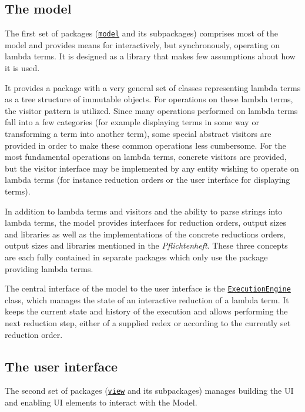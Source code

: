 \documentclass[a4paper, parskip=half]{scrartcl}
\newcommand{\pkglnk}[1]{\hyperref[pkg:edu.kit.wavelength.client.#1]{#1}}
\begin{document}
\subsection{The model}

The first set of packages (\texttt{\pkglnk{model}} and its subpackages) comprises most of the model and provides means for interactively, but
synchronously, operating on lambda terms. It is designed as a library that makes few
assumptions about how it is used.

It provides a package with a very general set of classes representing
lambda terms as a tree structure of immutable objects. For operations on these lambda
terms, the visitor pattern is utilized. Since many operations performed on lambda terms
fall into a few categories (for example displaying terms in some way or transforming a term
into another term), some special abstract visitors are provided in order to make these common
operations less cumbersome. For the most fundamental operations on lambda terms, concrete
visitors are provided, but the visitor interface may be implemented by any entity wishing
to operate on lambda terms (for instance reduction orders or the user interface for displaying
terms).

In addition to lambda terms and visitors and the ability to parse strings into
lambda terms, the model provides interfaces for reduction orders,
output sizes and libraries as well as the implementations of the concrete reductions orders,
output sizes and libraries mentioned in the \textit{Pflichtenheft}. These three
concepts are each fully contained in separate packages which only use the package
providing lambda terms.

The central interface of the model to the user interface is the
\texttt{\hyperref[type:edu.kit.wavelength.client.model.ExecutionEngine]{ExecutionEngine}}
class, which manages the state of an interactive reduction of a lambda term. It
keeps the current state and history of the execution and allows performing the next
reduction step, either of a supplied redex or according to the currently set reduction
order.

\subsection{The user interface}

The second set of packages (\texttt{\pkglnk{view}} and its subpackages) manages building the UI 
and enabling UI elements to interact with the Model.
\end{document}

